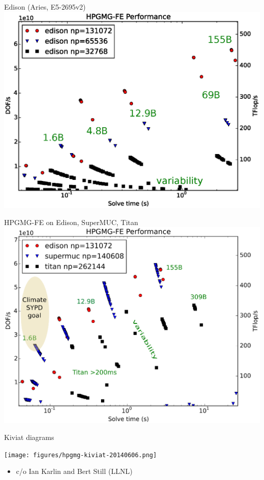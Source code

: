 \documentclass{beamer}
\begin{document}
\begin{frame}{Edison (Aries, E5-2695v2)}
  \includegraphics[width=\textwidth]{figures/hpgmg/range-edison-ann.eps}
\end{frame}

\begin{frame}{HPGMG-FE on Edison, SuperMUC, Titan}
  \includegraphics[width=\textwidth]{figures/hpgmg/range-edison-supermuc-titan-ann2.eps}
\end{frame}

\begin{frame}{Kiviat diagrams}
  \begin{center}
    \texttt{[image: figures/hpgmg-kiviat-20140606.png]}
  \end{center}
  \begin{itemize}
  \item c/o Ian Karlin and Bert Still (LLNL)
  \end{itemize}
\end{frame}
\end{document}
